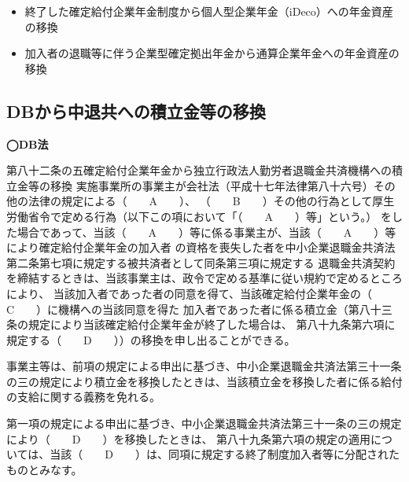 \begin{answerbox}
  \begin{itemize}
    \item 終了した確定給付企業年金制度から個人型企業年金（iDeco）への年金資産の移換
    \item 加入者の退職等に伴う企業型確定拠出年金から通算企業年金への年金資産の移換
  \end{itemize}
\end{answerbox}

\newpage

\subsection{DBから中退共への積立金等の移換}

\begin{fillblank}[年金1 2020 問題1(2)A〜D]
  \noindent \textbf{◯DB法}
  \begin{lawstructure}
    \begin{lawarticle}{第八十二条の五}{確定給付企業年金から独立行政法人勤労者退職金共済機構への積立金等の移換}
      実施事業所の事業主が会社法（平成十七年法律第八十六号）その他の法律の規定による（　　A　　）、
      （　　B　　）その他の行為として厚生労働省令で定める行為（以下この項において「（　　A　　）等」という。）
      をした場合であって、当該（　　A　　）等に係る事業主が、当該（　　A　　）等により確定給付企業年金の加入者
      の資格を喪失した者を中小企業退職金共済法第二条第七項に規定する被共済者として同条第三項に規定する
      退職金共済契約を締結するときは、当該事業主は、政令で定める基準に従い規約で定めるところにより、
      当該加入者であった者の同意を得て、当該確定給付企業年金の（　　C　　）に機構への当該同意を得た
      加入者であった者に係る積立金（第八十三条の規定により当該確定給付企業年金が終了した場合は、
      第八十九条第六項に規定する（　　D　　））の移換を申し出ることができる。

      事業主等は、前項の規定による申出に基づき、中小企業退職金共済法第三十一条の三の規定により積立金を移換したときは、当該積立金を移換した者に係る給付の支給に関する義務を免れる。

      第一項の規定による申出に基づき、中小企業退職金共済法第三十一条の三の規定により（　　D　　）を移換したときは、
      第八十九条第六項の規定の適用については、当該（　　D　　）は、同項に規定する終了制度加入者等に分配されたものとみなす。
    \end{lawarticle}
  \end{lawstructure}
\end{fillblank}


